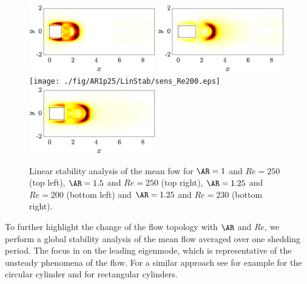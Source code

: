 \begin{figure}
  \centering
  \includegraphics[width=0.49\textwidth]{./fig/AR1/LinStab/sens_Re250.eps}
  \includegraphics[width=0.49\textwidth]{./fig/AR1p5/LinStab/sens_Re250.eps}
  \texttt{[image: ./fig/AR1p25/LinStab/sens\_Re200.eps]}
  \includegraphics[width=0.49\textwidth]{./fig/AR1p25/LinStab/sens_Re230.eps}
  \caption{Linear stability analysis of the mean fow for $\AR=1$ and $Re=250$ (top left), $\AR=1.5$ and $Re=250$ (top right), $\AR=1.25$ and $Re=200$ (bottom left) and $\AR=1.25$ and $Re=230$ (bottom right).}
  \label{fig:mf_sens}
\end{figure}
%
To further highlight the change of the flow topology with $\AR$ and $Re$, we perform a global stability analysis of the mean flow averaged over one shedding period. The focus in on the leading eigenmode, which is representative of the unsteady phenomena of the flow. For a similar approach see for example \cite{pier-2002,barkley-2006} for the circular cylinder and \cite{chiarini-quadrio-auteri-2022} for rectangular cylinders. 
%
